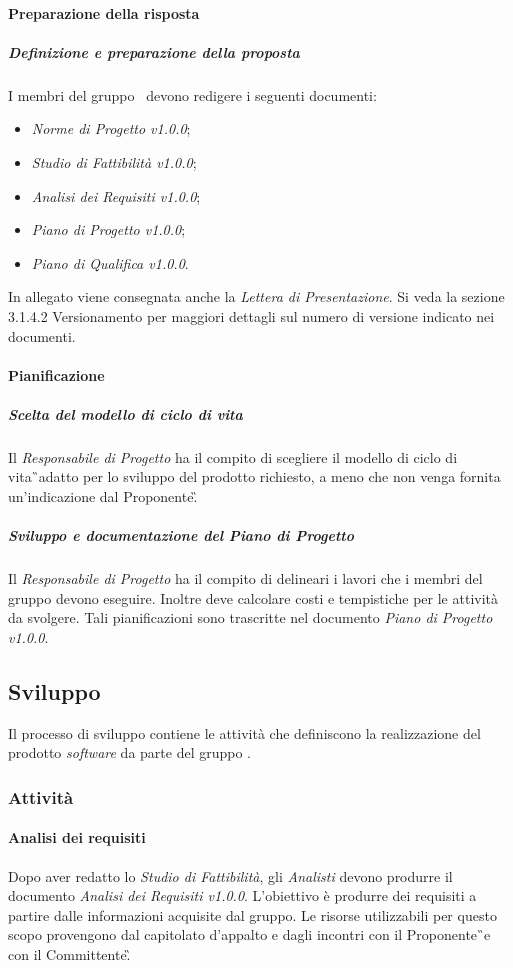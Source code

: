 \paragraph{Preparazione della risposta}
\subparagraph{Definizione e preparazione della proposta}
I membri del gruppo  \GRUPPO\ devono redigere i seguenti documenti:
\begin{itemize}
	\item{\textit{Norme di Progetto v1.0.0};}
	\item{\textit{Studio di Fattibilità v1.0.0};}
	\item{\textit{Analisi dei Requisiti v1.0.0};}
	\item{\textit{Piano di Progetto v1.0.0};}
	\item{\textit{Piano di Qualifica v1.0.0}.}
\end{itemize}
In allegato viene consegnata anche la \textit{Lettera di Presentazione}. Si veda la sezione 3.1.4.2 Versionamento per maggiori dettagli sul numero di versione indicato nei documenti.

\paragraph{Pianificazione}
\subparagraph{Scelta del modello di ciclo di vita}
Il \textit{Responsabile di Progetto} ha il compito di scegliere il modello di ciclo di vita\G\ adatto per lo sviluppo del prodotto richiesto, a meno che non venga fornita un'indicazione dal Proponente\G.
\subparagraph{Sviluppo e documentazione del Piano di Progetto}
Il \textit{Responsabile di Progetto} ha il compito di delineari i lavori che i membri del gruppo devono eseguire. Inoltre deve calcolare costi e tempistiche per le attività da svolgere. Tali pianificazioni sono trascritte nel documento \textit{Piano di Progetto v1.0.0}.

\subsection{Sviluppo}
Il processo di sviluppo contiene le attività che definiscono la realizzazione del prodotto \textit{software} da parte del gruppo \GRUPPO.

\subsubsection{Attività}
\paragraph{Analisi dei requisiti}
Dopo aver redatto lo \textit{Studio di Fattibilità}, gli \textit{Analisti} devono produrre il documento \textit{Analisi dei Requisiti v1.0.0}. L'obiettivo è produrre dei requisiti a partire dalle informazioni acquisite dal gruppo.
Le risorse utilizzabili per questo scopo provengono dal capitolato d'appalto e dagli incontri con il Proponente\G\ e con il Committente\G.

